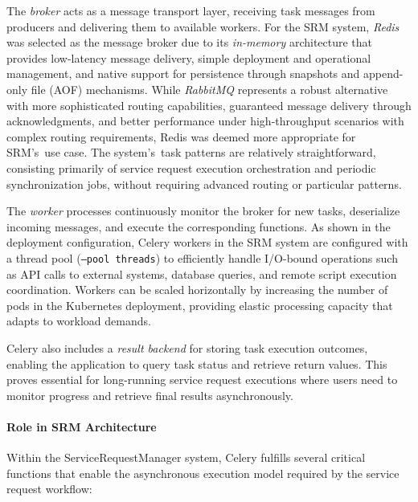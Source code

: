 The \textit{broker} acts as a message transport layer, receiving task messages from producers and delivering them to available workers. For the SRM system, \textit{Redis} was selected as the message broker due to its \textit{in-memory} architecture that provides low-latency message delivery, simple deployment and operational management, and native support for persistence through snapshots and append-only file (AOF) mechanisms. While \textit{RabbitMQ} represents a robust alternative with more sophisticated routing capabilities, guaranteed message delivery through acknowledgments, and better performance under high-throughput scenarios with complex routing requirements, Redis was deemed more appropriate for SRM's~use case. The system's~task patterns are relatively straightforward, consisting primarily of service request execution orchestration and periodic synchronization jobs, without requiring advanced routing or particular patterns.

The \textit{worker} processes continuously monitor the broker for new tasks, deserialize incoming messages, and execute the corresponding functions. As shown in the deployment configuration, Celery workers in the SRM system are configured with a thread pool (\texttt{--pool threads}) to efficiently handle I/O-bound operations such as API calls to external systems, database queries, and remote script execution coordination. Workers can be scaled horizontally by increasing the number of pods in the Kubernetes deployment, providing elastic processing capacity that adapts to workload demands.

Celery also includes a \textit{result backend} for storing task execution outcomes, enabling the application to query task status and retrieve return values. This proves essential for long-running service request executions where users need to monitor progress and retrieve final results asynchronously.

\paragraph{Role in SRM Architecture}

Within the ServiceRequestManager system, Celery fulfills several critical functions that enable the asynchronous execution model required by the service request workflow:

